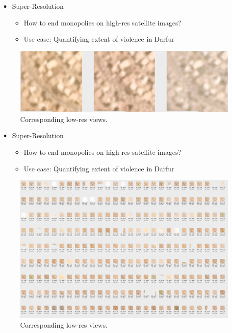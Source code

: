 \documentclass[10pt,mathserif]{beamer}
\begin{document}
\begin{frame}
  \begin{itemize}
  \item Super-Resolution
    \begin{itemize}
    \item How to end monopolies on high-res satellite images?
    \item Use case: Quantifying extent of violence in Darfur
    \end{itemize}
  \end{itemize} 
  \begin{figure}[ht]
    \centering
    \includegraphics[width=0.8\paperwidth]{figures/multiframe_khartoum}
    \caption{Corresponding low-res views. \label{fig:label} }
  \end{figure}
\end{frame}

\begin{frame}
  \begin{itemize}
  \item Super-Resolution
    \begin{itemize}
    \item How to end monopolies on high-res satellite images?
    \item Use case: Quantifying extent of violence in Darfur
    \end{itemize}
  \end{itemize} 
  \begin{figure}[ht]
    \centering
    \includegraphics[width=0.7\paperwidth]{figures/multliframe_khartoum_2}
    \caption{Corresponding low-res views. \label{fig:label} }
  \end{figure}
\end{frame}
\end{document}
